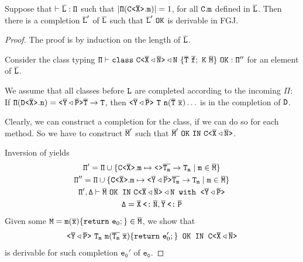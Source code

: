 \begin{theorem}
  Suppose that $\mathtt{\vdash \overline{\tt L} : \Pi}$ such that $|\mathtt{\Pi (\mathtt{C \texttt{<} \overline{\tt X} \texttt{>} }.m)}| = 1$, for all ${\tt C.m}$ defined in $\overline{\tt L}$. Then there is a completion $\overline{\tt L}'$ of $\overline{\tt L}$ such that
  $\ol{L}'\ \mathtt{OK}$ is derivable in FGJ. 
\end{theorem}
\begin{proof}
  The proof is by induction on the length of $\overline{\tt L}$.

  Consider the class typing $\mathtt{ \Pi \vdash \texttt{class}\ \mathtt{C \texttt{<} \overline{\tt X} 
        \triangleleft \overline{\tt N} \texttt{>} } \triangleleft N\ \{ \overline{\tt T} \
      \overline{\tt f}; \ K \ \overline{\tt M} \} \ \texttt{OK} : \Pi''}$ for an element of $\overline{\tt L}$.

    We assume that all classes before ${\tt L}$ are completed according to the incoming $\mathtt{\Pi}$:
    If $\mathtt{\Pi (\mathtt{D \texttt{<} \overline{\tt X} \texttt{>} }.n)} = \mathtt{\mathtt{ \texttt{<} \overline{\tt Y} \triangleleft  \overline{\tt P} \texttt{>} }
      \overline{\tt T} \to T}$, then $\mathtt{\exptype{}{\ol{Y} \triangleleft  \ol{P}}\ T\ \mv{n}(\ol{T}\
      \ol{x}) \dots}$ is in the completion of ${\tt D}$.

    Clearly, we can construct a completion for the class, if we can do so for each method. So we
    have to construct $\overline{\tt M}'$ such that $\mathtt{\ol{M}'\ \mathtt{OK\ IN}\ \exptype{C}{\ol{X} 
        \triangleleft \ol{N}}}$. 

    Inversion of  yields
    \begin{gather}
      \label{eq:3}
      \mathtt{\Pi' = \Pi \cup \{ \mathtt{C \texttt{<} \overline{\tt X} \texttt{>} }.m \mapsto \mathtt{ \texttt{<}  \texttt{>} } \overline{\tt T_m} \to T_m \mid m \in \overline{\tt M} \} } \\
      \mathtt{\Pi'' = \Pi \cup \{ \mathtt{C \texttt{<} \overline{\tt X} \texttt{>} }.m \mapsto
          \mathtt{ \texttt{<} \overline{\tt Y} \triangleleft  \overline{\tt P} \texttt{>} } \overline{\tt T_m} \to T_m \mid m \in \overline{\tt M} \} } \\
      \label{eq:5}
      \mathtt{\Pi', \Delta \vdash \overline{\tt M} \ \texttt{OK IN}\
        \mathtt{C \texttt{<} \overline{\tt X} \triangleleft \overline{\tt N} \texttt{>} } \triangleleft N  \texttt{
          with } \mathtt{ \texttt{<} \overline{\tt Y} \triangleleft  \overline{\tt P} \texttt{>} }} \\
      \label{eq:7}
      \mathtt{\Delta = \overline{\tt X} \mathbin{\texttt{<:}}  \overline{\tt N}, \overline{\tt Y} \mathbin{\texttt{<:}}  \overline{\tt P}}
    \end{gather}
    Given some ${\tt M} = \texttt{m}(\overline{\tt \mathtt{x}}) \{\texttt{return}\ \mathtt{e}_0;\} \in \overline{\tt M}$,
    we show that
    \begin{gather}
      \label{eq:4}
      \exptype{}{\ol{Y} \triangleleft  \ol{P}}\ \mathtt{T_m}\ \texttt{m}(\ol{T_m}\ \ol{{x}})
      \{\texttt{return}\ \mathtt{e}'_0;\} \texttt{ OK IN }\exptype{C}{\ol{X} \triangleleft \ol{N}}
    \end{gather}
    is derivable for such completion $\mathtt{e_0'}$ of $\mathtt{e_0}$.


\end{proof}
